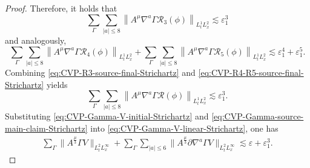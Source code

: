 \documentclass[11pt,twoside]{article}
\def\p{\partial}
\def\ve{\varepsilon}
\def\ls{\lesssim}
\theoremstyle{plain}
\theoremstyle{definition}
\theoremstyle{assumption}
\numberwithin{equation}{section}
\begin{document}
\begin{proof}
		Therefore, it holds that
		\begin{equation}
			\label{eq:CVP-R3-source-final-Strichartz}
			\sum_{\Gamma}
			\sum_{|a|\le 8}
			\left\|
			A^{\mu}
			\nabla^a\Gamma\mathcal R_3(\phi)
			\right\|_{L^1_tL^2_x}
			\ls
			\ve_1^3
		\end{equation}
		and analogously,
		\begin{equation}
			\label{eq:CVP-R4-R5-source-final-Strichartz}
			\sum_{\Gamma}
			\sum_{|a|\le 8}
			\left\|
			A^{\mu}
			\nabla^a\Gamma\mathcal R_4(\phi)
			\right\|_{L^1_tL^2_x}
			+\sum_{\Gamma}
			\sum_{|a|\le 8}
			\left\|
			A^{\mu}
			\nabla^a\Gamma\mathcal R_5(\phi)
			\right\|_{L^1_tL^2_x}
			\ls
			\ve_1^4+\ve_1^5.
		\end{equation}
		Combining \eqref{eq:CVP-R3-source-final-Strichartz} and
		\eqref{eq:CVP-R4-R5-source-final-Strichartz} yields
		\begin{equation}
			\label{eq:CVP-Gamma-source-main-claim-Strichartz}
			\sum_{\Gamma}
			\sum_{|a|\le 8}
			\left\|
			A^{\mu}
			\nabla^a\Gamma\mathcal R(\phi)
			\right\|_{L^1_tL^2_x}\ls
			\ve_1^3.
		\end{equation}
		Substituting \eqref{eq:CVP-Gamma-V-initial-Strichartz} and
		\eqref{eq:CVP-Gamma-source-main-claim-Strichartz} into
		\eqref{eq:CVP-Gamma-V-linear-Strichartz}, one has
		\begin{equation}
			\label{eq:CVP-Gamma-V-pointwise-final-Strichartz}
			\begin{aligned}
				\sum_{\Gamma}
				\big\|
				A^{\frac{\mu}{3}}\Gamma V
				\big\|_{L^2_{t}L^\infty_x}
				+
				\sum_{\Gamma}
				\sum_{|a|\le 6}
				\big\|
				A^{\frac{\mu}{3}}
				\p\nabla^a\Gamma V
				\big\|_{L^2_{t}L^\infty_x}
				\ls
				\ve+\ve_1^3.
			\end{aligned}
		\end{equation}
		

\end{proof}
\end{document}

